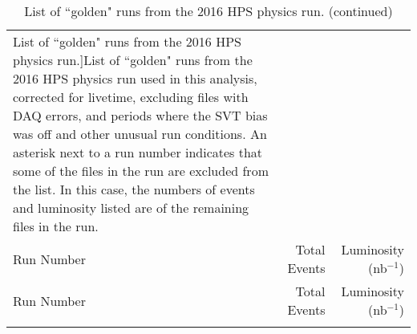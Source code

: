 \documentclass[11pt]{article}
\begin{document}
\begin{longtable}[!hbtp]{l r r}


\caption[List of ``golden" runs from the 2016 HPS physics run.]{List of ``golden" runs from the 2016 HPS physics run used in this analysis, corrected for livetime, excluding files with DAQ errors, and periods where the SVT bias was off and other unusual run conditions.  An asterisk next to a run number indicates that some of the files in the run are excluded from the list.  In this case, the numbers of events and luminosity listed are of the remaining files in the run.} \\
\label{tbl:runs_used}
  \hline
  Run Number & Total Events  &	Luminosity (nb$^{-1}$) \\
  \hline
\endfirsthead
\caption{List of ``golden" runs from the 2016 HPS physics run. (continued)}
  \hline
  Run Number & Total Events  &	Luminosity (nb$^{-1}$) \\
  \hline
\endhead
\hline


\endfoot


\end{longtable}
\end{document}
